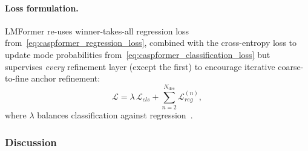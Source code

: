 \paragraph{Loss formulation.}
LMFormer re-uses winner-takes-all regression loss from~\autoref{eq:caspformer_regression_loss}, combined with the cross-entropy loss to update mode probabilities from~\autoref{eq:caspformer_classification_loss} but supervises \emph{every} refinement layer (except the first) to encourage iterative coarse-to-fine anchor refinement:
\begin{equation}
  \mathcal{L}
  = \lambda\,\mathcal{L}_{cls}
    + \sum_{n=2}^{N_{\text{dec}}}\mathcal{L}_{reg}^{(n)},
  \label{eq:lm_loss}
\end{equation}
where \(\lambda\) balances classification against regression~\cite{lmformerYadav2025}.

\subsubsection*{Discussion} %

